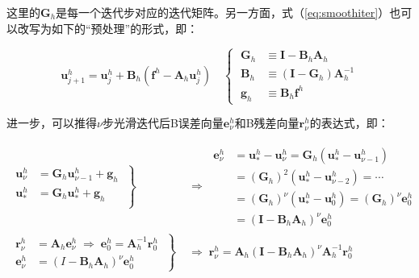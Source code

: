 \documentclass[12pt, UTF8, nofonts]{ctexart}
\begin{document}
这里的$\boldsymbol{G}_h$是每一个迭代步对应的迭代矩阵。另一方面，式（\ref{eq:smoothiter}）也可以改写为如下的“预处理”的形式，即：

\begin{equation}
  \label{eq:smootheriterpre}
  \boldsymbol{u}_{j+1}^h = \boldsymbol{u}_{j}^h + \boldsymbol{B}_h(\boldsymbol{f}^h - \boldsymbol{A}_h \boldsymbol{u}_j^h)
  \quad\left\{\; \begin{aligned}
    \boldsymbol{G}_h &\equiv \boldsymbol{I} - \boldsymbol{B}_h\boldsymbol{A}_h \\
    \boldsymbol{B}_h &\equiv (\boldsymbol{I} - \boldsymbol{G}_h)\boldsymbol{A}_h^{-1} \\
    \boldsymbol{g}_h &\equiv \boldsymbol{B}_h\boldsymbol{f}^h
  \end{aligned}\right.
\end{equation}

进一步，可以推得$\nu$步光滑迭代后B误差向量$\boldsymbol{e}_{\nu}^h$和B残差向量$\boldsymbol{r}_{\nu}^h$的表达式，即：

\begin{equation}
  \label{eq:errres}
  \begin{aligned}
    \left.\begin{aligned}
      \boldsymbol{u}_{\nu}^h &= \boldsymbol{G}_h \boldsymbol{u}_{\nu-1}^h + \boldsymbol{g}_h \\
      \boldsymbol{u}_{\ast}^h &= \boldsymbol{G}_h \boldsymbol{u}_{\ast}^h + \boldsymbol{g}_h \\
    \end{aligned} \;\right\} &\;\Rightarrow\;
    \begin{aligned}
      \boldsymbol{e}_{\nu}^h &= \boldsymbol{u}_{\ast}^h - \boldsymbol{u}_{\nu}^h = \boldsymbol{G}_{h} (\boldsymbol{u}_{\ast}^h - \boldsymbol{u}_{\nu-1}^h) \\
      &= (\boldsymbol{G}_h)^2(\boldsymbol{u}_{\ast}^h-\boldsymbol{u}_{\nu-2}^h) = \cdots \\
      &= (\boldsymbol{G}_{h})^{\nu}(\boldsymbol{u}_{\ast}^h - \boldsymbol{u}_{0}^{h}) = (\boldsymbol{G}_{h})^{\nu}\boldsymbol{e}_0^h \\
      &=(\boldsymbol{I} - \boldsymbol{B}_h\boldsymbol{A}_h)^{\nu} \boldsymbol{e}_0^h
    \end{aligned} \\
    \left.\begin{aligned}
      \boldsymbol{r}_{\nu}^h &= \boldsymbol{A}_h \boldsymbol{e}_{\nu}^h \;\Rightarrow\; \boldsymbol{e}_{0}^h = \boldsymbol{A}^{-1}_{h}\boldsymbol{r}_{0}^h \\
      \boldsymbol{e}_{\nu}^h &= (I-\boldsymbol{B}_h\boldsymbol{A}_h)^{\nu}\boldsymbol{e}_0^h
    \end{aligned} \;\right\} &\;\Rightarrow\;
    \boldsymbol{r}_{\nu}^h = \boldsymbol{A}_h (\boldsymbol{I}-\boldsymbol{B}_h\boldsymbol{A}_h)^{\nu} \boldsymbol{A}^{-1}_h\boldsymbol{r}_0^h
  \end{aligned}
\end{equation}
\end{document}
